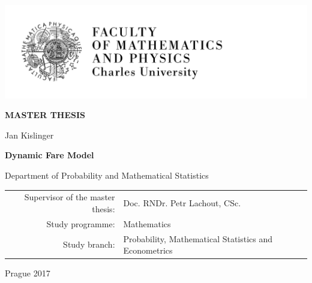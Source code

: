 \pagestyle{empty}
\hypersetup{pageanchor=false}
\begin{center}

\centerline{\mbox{\includegraphics[width=166mm]{figures/mfflogo_new.pdf}}} %

\vspace{-8mm}
\vfill

{\bf\Large MASTER THESIS}

\vfill

{\LARGE Jan Kislinger}

\vspace{15mm}

{\LARGE\bfseries Dynamic Fare Model}

\vfill

Department of Probability and Mathematical Statistics

\vfill

\begin{tabular}{rl}

Supervisor of the master thesis: & Doc. RNDr. Petr Lachout, CSc. \\
\noalign{\vspace{2mm}}
Study programme: & Mathematics \\
\noalign{\vspace{2mm}}
Study branch: & 
	\begin{minipage}[t]{220px}%
		Probability, Mathematical Statistics and Econometrics
	\end{minipage} \tabularnewline
\end{tabular}

\vfill

Prague 2017

\end{center}





\newpage

